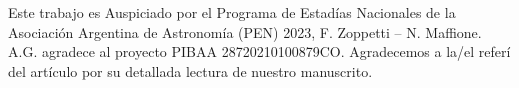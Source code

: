 \documentclass[baaa]{baaa}
\begin{document}
\begin{acknowledgement}
Este trabajo es Auspiciado por el Programa de Estadías Nacionales de la Asociación Argentina de Astronomía (PEN) 2023, F. Zoppetti – N. Maffione. A.G. agradece al proyecto PIBAA 28720210100879CO. Agradecemos a la/el refer\'i del art\'iculo por su detallada lectura de nuestro manuscrito.
\end{acknowledgement}








\end{document}
